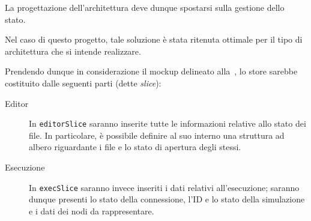       La progettazione dell'architettura deve dunque spostarsi sulla gestione dello stato.







    
      Nel caso di questo progetto, tale soluzione è stata ritenuta ottimale per il tipo di architettura che si intende realizzare.

      Prendendo dunque in considerazione il mockup delineato alla~, lo store sarebbe costituito dalle seguenti parti (dette \emph{slice}):

      \begin{description}
        \item[Editor]
          In \texttt{editorSlice} saranno inserite tutte le informazioni relative allo stato dei file.
          In particolare, è possibile definire al suo interno una struttura ad albero riguardante i file e lo stato di apertura degli stessi.
        \item[Esecuzione]
          In \texttt{execSlice} saranno invece inseriti i dati relativi all'esecuzione;
          saranno dunque presenti lo stato della connessione, l'ID e lo stato della simulazione e i dati dei nodi da rappresentare.
      \end{description}

